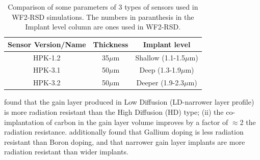\documentclass[11pt]{article}
\begin{document}
\begin{table}[!h]
    \centering
    \begin{tabular}{|c|c|c|}
        \hline
        Sensor Version/Name & Thickness & Implant level        \\ \hline
        HPK-1.2             & 35$\mu$m & Shallow (1.1-1.5$\mu$m) \\ \hline
        HPK-3.1             & 50$\mu$m & Deep (1.3-1.9$\mu$m)    \\ \hline
        HPK-3.2             & 50$\mu$m & Deeper (1.9-2.3$\mu$m)    \\ \hline
    \end{tabular}
    \caption{Comparison of some parameters of 3 types of sensors used in WF2-RSD simulations. The numbers in paranthesis in the Implant level column are ones used in WF2-RSD.}
    \label{tab:hpk-sensor-parameters}
\end{table}
\begin{table}[h]
    \centering
    \caption{Some differences between the impact-ionization models that can be used in WF2-RSD.}
    \label{tab:impact-ionization-models}
\end{table}
\cite{arcidiacono-irradiation} found that the gain layer produced in Low Diffusion (LD-narrower layer profile) is more radiation resistant than the High Diffusion (HD) type; (ii) the co-implantation of carbon in the gain layer volume improves by a factor of $\approx$2 the radiation resistance. \cite{ferrero-radiation-hardness} additionally found that Gallium doping is less radiation resistant than Boron doping, and that narrower gain layer implants are more radiation resistant than wider implants.
\end{document}
